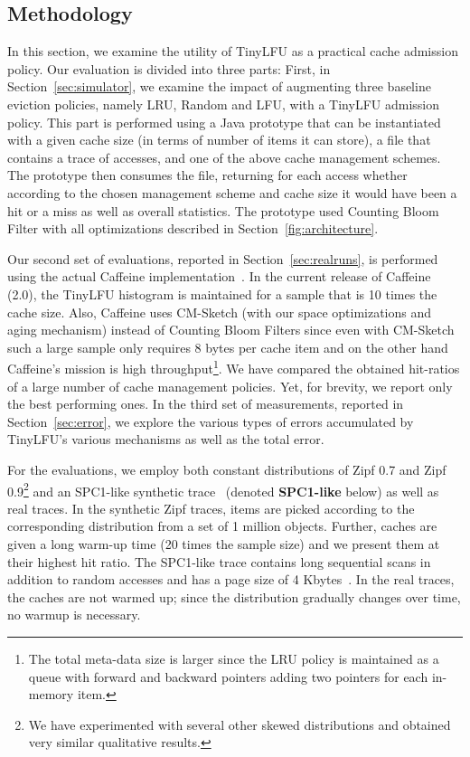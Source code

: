 \documentclass[10pt,a4paper]{article}
\begin{document}
\subsection{Methodology}
\label{sec:method}
In this section, we examine the utility of TinyLFU as a practical cache admission policy.
Our evaluation is divided into three parts:
First, in Section~\ref{sec:simulator}, we examine the impact of augmenting three baseline eviction policies, namely LRU, Random and LFU, with a TinyLFU admission policy.
This part is performed using a Java prototype that can be instantiated with a given cache size (in terms of number of items it can store), a file that contains a trace of accesses, and one of the above cache management schemes.
The prototype then consumes the file, returning for each access whether according to the chosen management scheme and cache size it would have been a hit or a miss as well as overall statistics.
The prototype used Counting Bloom Filter with all optimizations described in Section~\ref{fig:architecture}.

Our second set of evaluations, reported in Section~\ref{sec:realruns}, is performed using the actual Caffeine implementation~\cite{CaffeineProject}.
In the current release of Caffeine (2.0), the TinyLFU histogram is maintained for a sample that is 10 times the cache size.
Also, Caffeine uses CM-Sketch (with our space optimizations and aging mechanism) instead of Counting Bloom Filters since even with CM-Sketch such a large sample only requires 8 bytes per cache item and on the other hand Caffeine's mission is high throughput\footnote{
The total meta-data size is larger since the LRU policy is maintained as a queue with forward and backward pointers adding two pointers for each in-memory item.}.
We have compared the obtained hit-ratios of a large number of cache management policies.
Yet, for brevity, we report only the best performing ones.
In the third set of measurements, reported in Section~\ref{sec:error}, we explore the various types of errors accumulated by TinyLFU's various mechanisms as well as the total error.

For the evaluations, we employ both constant distributions of Zipf 0.7 and Zipf 0.9\footnote{We have experimented with several other skewed distributions and obtained very similar qualitative results.}
and an SPC1-like synthetic trace~\cite{ARC} (denoted \textbf{SPC1-like} below) as well as real traces.
In the synthetic Zipf traces, items are picked according to the corresponding distribution from a set of 1 million objects.
Further, caches are given a long warm-up time (20 times the sample size) and we present them at their highest hit ratio.
The SPC1-like trace contains long sequential scans in addition to random accesses and has a page size of 4 Kbytes~\cite{ARC}.
In the real traces, the caches are not warmed up; since the distribution gradually changes over time, no warmup is necessary.
\end{document}
